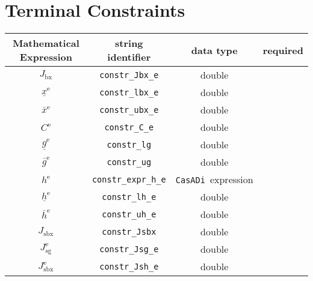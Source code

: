 \documentclass{article}
\newcommand{\code}[1]{\texttt{#1}}
\newcommand{\casadi}{\texttt{CasADi}}
\newcommand{\ind}[1]{_{\textrm{#1}}}
\newcommand{\terminal}{^{\textrm{e}}}
\begin{document}
\newpage
\section{Terminal Constraints}
\begin{table}[h]
	\centering
	\begin{tabular}{|c|c|c|c|}
		\toprule
		Mathematical Expression & string identifier & data type  & required \\ \midrule
		$J_{\textrm{bx}}$ & \code{constr\_Jbx\_e}    & double   & \optional   \\
		$\underline{x}\terminal $    & \code{constr\_lbx\_e}     & double  & \optional   \\
		$\bar{x}\terminal $         & \code{constr\_ubx\_e}     & double   & \optional  \\ \midrule
		$ C\terminal $ & \code{constr\_C\_e}    & double   & \optional   \\
		$\underline{g}\terminal $    & \code{constr\_lg}     & double   & \optional   \\
		$\bar{g}\terminal $         & \code{constr\_ug}     & double   & \optional  \\ \midrule
		$ h\terminal $ & \code{constr\_expr\_h\_e}    & \casadi~expression   & \optional  \\
		$\underline{h}\terminal $    & \code{constr\_lh\_e}     & double   & \optional   \\
		$\bar{h}\terminal $         & \code{constr\_uh\_e}     & double  & \optional   \\ \midrule
		$ J\ind{sbx} $ & \code{constr\_Jsbx} & double  & \optional \\
		$ J\ind{sg}\terminal $ & \code{constr\_Jsg\_e} & double & \optional  \\
		$ J\ind{sbx}\terminal $ & \code{constr\_Jsh\_e} & double  & \optional  \\
		\bottomrule
	\end{tabular}
\end{table}
\end{document}
